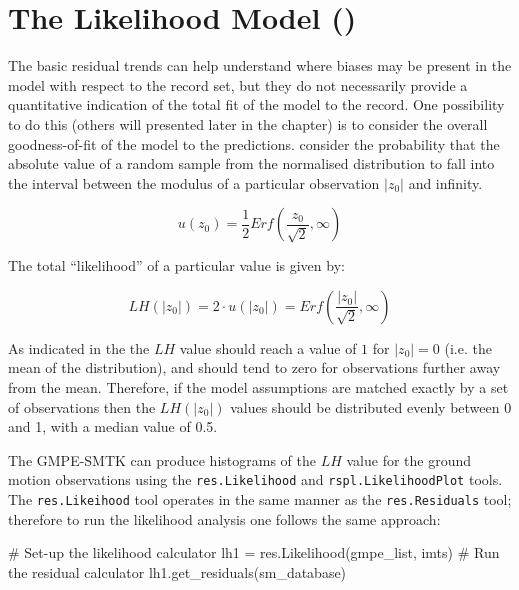 \section{The Likelihood Model (\cite{Scherbaum_etal2004})}
\label{sec:lh_model}

The basic residual trends can help understand where biases may be present in the model with respect to the record set, but they do not necessarily provide a quantitative indication of the total fit of the model to the record. One possibility to do this (others will presented later in the chapter) is to consider the overall goodness-of-fit of the model to the predictions. \cite{Scherbaum_etal2004} consider the probability that the absolute value of a random sample from the normalised distribution to fall into the interval between the modulus of a particular observation $|z_0|$ and infinity.

\begin{equation}
u \left( {z_0} \right) = \frac{1}{2} Erf\left( {\frac{z_0}{\sqrt{2}}, \infty} \right)
\end{equation}

The total ``likelihood'' of a particular value is given by:

\begin{equation}
LH \left( {|z_0|} \right) = 2 \cdot u \left( {|z_0|} \right) = Erf \left( {\frac{|z_0|}{\sqrt{2}}, \infty} \right)
\end{equation}

As indicated in \cite{Scherbaum_etal2004} the the $LH$ value should reach a value of $1$ for $|z_0|=0$ (i.e. the mean of the distribution), and should tend to zero for observations further away from the mean. Therefore, if the model assumptions are matched exactly by a set of observations then the $LH \left( {|z_0|} \right)$ values should be distributed evenly between 0 and 1, with a median value of 0.5. 

The GMPE-SMTK can produce histograms of the $LH$ value for the ground motion observations using the \verb=res.Likelihood= and \verb=rspl.LikelihoodPlot= tools. The \verb=res.Likeihood= tool operates in the same manner as the \verb=res.Residuals= tool; therefore to run the likelihood analysis one follows the same approach:

\begin{python}[frame=single]
# Set-up the likelihood calculator
lh1 = res.Likelihood(gmpe_list, imts)
# Run the residual calculator
lh1.get_residuals(sm_database)
\end{python}


